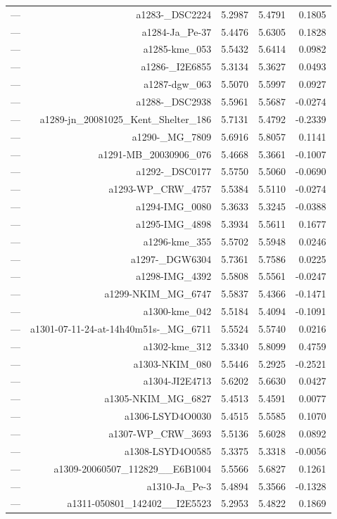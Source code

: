 \begin{table}[htbp]
\begin{tabular}{lrrrr}
— & a1283-_DSC2224 & 5.2987 & 5.4791 & 0.1805 \\
— & a1284-Ja_Pe-37 & 5.4476 & 5.6305 & 0.1828 \\
— & a1285-kme_053 & 5.5432 & 5.6414 & 0.0982 \\
— & a1286-_I2E6855 & 5.3134 & 5.3627 & 0.0493 \\
— & a1287-dgw_063 & 5.5070 & 5.5997 & 0.0927 \\
— & a1288-_DSC2938 & 5.5961 & 5.5687 & -0.0274 \\
— & a1289-jn_20081025_Kent_Shelter_186 & 5.7131 & 5.4792 & -0.2339 \\
— & a1290-_MG_7809 & 5.6916 & 5.8057 & 0.1141 \\
— & a1291-MB_20030906_076 & 5.4668 & 5.3661 & -0.1007 \\
— & a1292-_DSC0177 & 5.5750 & 5.5060 & -0.0690 \\
— & a1293-WP_CRW_4757 & 5.5384 & 5.5110 & -0.0274 \\
— & a1294-IMG_0080 & 5.3633 & 5.3245 & -0.0388 \\
— & a1295-IMG_4898 & 5.3934 & 5.5611 & 0.1677 \\
— & a1296-kme_355 & 5.5702 & 5.5948 & 0.0246 \\
— & a1297-_DGW6304 & 5.7361 & 5.7586 & 0.0225 \\
— & a1298-IMG_4392 & 5.5808 & 5.5561 & -0.0247 \\
— & a1299-NKIM_MG_6747 & 5.5837 & 5.4366 & -0.1471 \\
— & a1300-kme_042 & 5.5184 & 5.4094 & -0.1091 \\
— & a1301-07-11-24-at-14h40m51s-_MG_6711 & 5.5524 & 5.5740 & 0.0216 \\
— & a1302-kme_312 & 5.3340 & 5.8099 & 0.4759 \\
— & a1303-NKIM_080 & 5.5446 & 5.2925 & -0.2521 \\
— & a1304-JI2E4713 & 5.6202 & 5.6630 & 0.0427 \\
— & a1305-NKIM_MG_6827 & 5.4513 & 5.4591 & 0.0077 \\
— & a1306-LSYD4O0030 & 5.4515 & 5.5585 & 0.1070 \\
— & a1307-WP_CRW_3693 & 5.5136 & 5.6028 & 0.0892 \\
— & a1308-LSYD4O0585 & 5.3375 & 5.3318 & -0.0056 \\
— & a1309-20060507_112829__E6B1004 & 5.5566 & 5.6827 & 0.1261 \\
— & a1310-Ja_Pe-3 & 5.4894 & 5.3566 & -0.1328 \\
— & a1311-050801_142402__I2E5523 & 5.2953 & 5.4822 & 0.1869 \\

\end{tabular}
\end{table}
